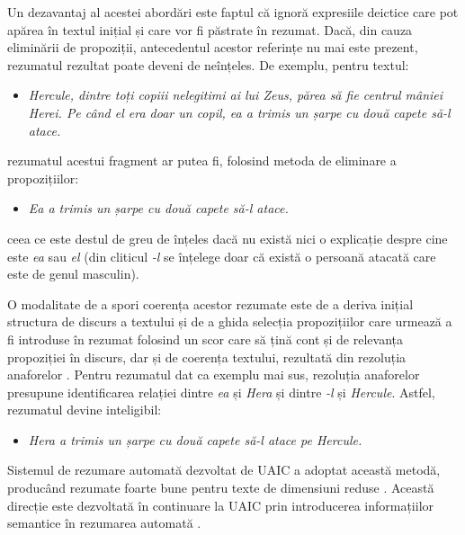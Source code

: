 \begin{multicols}{2}
Un dezavantaj al acestei abordări este faptul că ignoră expresiile deictice care pot apărea în textul inițial și care vor fi păstrate în rezumat. Dacă, din cauza eliminării de propoziții, antecedentul acestor referințe nu mai este prezent, rezumatul rezultat poate deveni de neînțeles. De exemplu, pentru textul:

\begin{itemize}
\item\textit{Hercule, dintre toți copiii nelegitimi ai lui Zeus, părea să fie centrul mâniei Herei. Pe când el era doar un copil, ea a trimis un șarpe cu două capete să-l atace.}
\end{itemize}

\noindent 
rezumatul acestui fragment ar putea fi, folosind metoda de eliminare a propozițiilor:

\begin{itemize}
\item\textit{Ea a trimis un șarpe cu două capete să-l atace.}
\end{itemize}

\noindent
ceea ce este destul de greu de înțeles dacă nu există nici o explicație despre cine este \textit{ea} sau \textit{el} (din cliticul 
\textit{-l} se înțelege doar că există o persoană atacată care este de genul masculin).

O modalitate de a spori coerența acestor rezumate este de a deriva inițial structura de discurs a textului și de a ghida selecția propozițiilor care urmează a fi introduse în rezumat folosind un scor care să țină cont și de relevanța propoziției în discurs, dar și de coerența textului, rezultată din rezoluția anaforelor \cite{cristea1}. Pentru rezumatul dat ca exemplu mai sus, rezoluția anaforelor presupune identificarea relației dintre \textit{ea} și \textit{Hera} și dintre \textit{-l} și \textit{Hercule}. Astfel, rezumatul devine inteligibil:

\begin{itemize}
\item\textit{Hera a trimis un șarpe cu două capete să-l atace pe Hercule.}
\end{itemize}

Sistemul de rezumare automată dezvoltat de UAIC a adoptat această metodă, producând rezumate foarte bune pentru texte de dimensiuni reduse \cite{cristea2}. Această direcție este dezvoltată în continuare la UAIC prin introducerea informațiilor semantice în rezumarea automată \cite{trandabatRez}.


\end{multicols}

